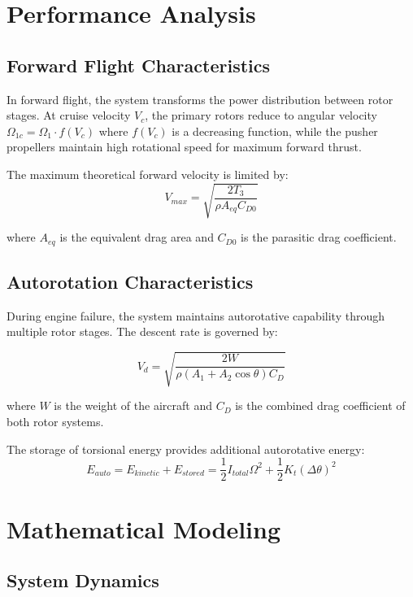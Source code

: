 \documentclass[12pt,a4paper]{article}
\begin{document}
\section{Performance Analysis}

\subsection{Forward Flight Characteristics}

In forward flight, the system transforms the power distribution between rotor stages. At cruise velocity $V_c$, the primary rotors reduce to angular velocity $\Omega_{1c} = \Omega_1 \cdot f(V_c)$ where $f(V_c)$ is a decreasing function, while the pusher propellers maintain high rotational speed for maximum forward thrust.

The maximum theoretical forward velocity is limited by:
\begin{equation}
V_{max} = \sqrt{\frac{2T_3}{\rho A_{eq} C_{D0}}}
\end{equation}

where $A_{eq}$ is the equivalent drag area and $C_{D0}$ is the parasitic drag coefficient.

\subsection{Autorotation Characteristics}

During engine failure, the system maintains autorotative capability through multiple rotor stages. The descent rate is governed by:

\begin{equation}
V_d = \sqrt{\frac{2W}{\rho(A_1 + A_2 \cos\theta)C_D}}
\end{equation}

where $W$ is the weight of the aircraft and $C_D$ is the combined drag coefficient of both rotor systems.

The storage of torsional energy provides additional autorotative energy:
\begin{equation}
E_{auto} = E_{kinetic} + E_{stored} = \frac{1}{2}I_{total}\Omega^2 + \frac{1}{2}K_t(\Delta\theta)^2
\end{equation}

\section{Mathematical Modeling}

\subsection{System Dynamics}
\end{document}
